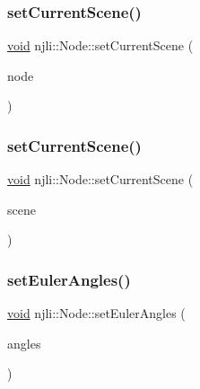 \mbox{\label{classnjli_1_1_node_ac88325ecd1e14a76fc00b3b55bc3fca8}} 
\subsubsection{\texorpdfstring{set\+Current\+Scene()}{setCurrentScene()}\hspace{0.1cm}{\footnotesize\ttfamily [1/2]}}
{\footnotesize\ttfamily \mbox{\hyperlink{_thread_8h_af1e856da2e658414cb2456cb6f7ebc66}{void}} njli\+::\+Node\+::set\+Current\+Scene (\begin{DoxyParamCaption}\item[{\mbox{\hyperlink{classnjli_1_1_node}{Node}} $\ast$}]{node }\end{DoxyParamCaption})}

\mbox{\label{classnjli_1_1_node_a5f1c647c5bd283ac008106863c06406b}} 
\subsubsection{\texorpdfstring{set\+Current\+Scene()}{setCurrentScene()}\hspace{0.1cm}{\footnotesize\ttfamily [2/2]}}
{\footnotesize\ttfamily \mbox{\hyperlink{_thread_8h_af1e856da2e658414cb2456cb6f7ebc66}{void}} njli\+::\+Node\+::set\+Current\+Scene (\begin{DoxyParamCaption}\item[{\mbox{\hyperlink{classnjli_1_1_scene}{Scene}} $\ast$}]{scene }\end{DoxyParamCaption})\hspace{0.3cm}{\ttfamily [protected]}}

\mbox{\label{classnjli_1_1_node_a13770061dcc44d37c1f2a94eb0cdddff}} 
\subsubsection{\texorpdfstring{set\+Euler\+Angles()}{setEulerAngles()}}
{\footnotesize\ttfamily \mbox{\hyperlink{_thread_8h_af1e856da2e658414cb2456cb6f7ebc66}{void}} njli\+::\+Node\+::set\+Euler\+Angles (\begin{DoxyParamCaption}\item[{const bt\+Vector3 \&}]{angles }\end{DoxyParamCaption})}



